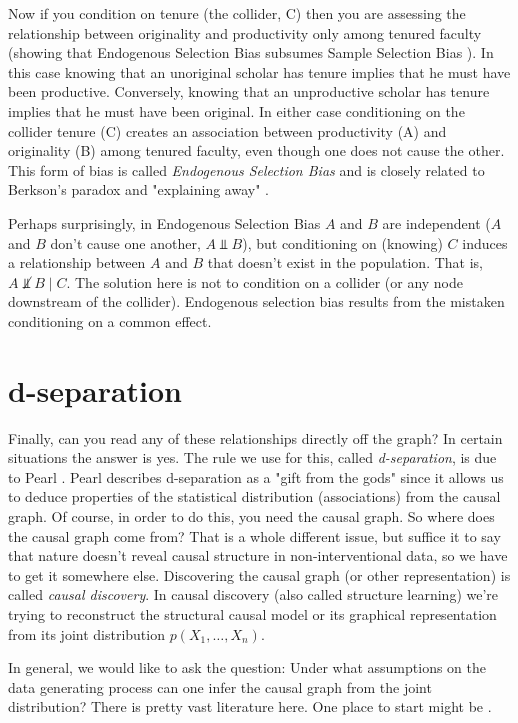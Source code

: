 \documentclass[11pt, oneside]{article}   	%
\begin{document}
\bigskip
\noindent
Now if you condition on tenure (the collider, C) then you are assessing the relationship between originality and productivity only among tenured faculty (showing 
that Endogenous Selection Bias subsumes Sample Selection Bias \cite{2008arXiv0805.2775C}). In this case knowing that an unoriginal scholar has tenure implies 
that he must have been productive. Conversely, knowing that an unproductive scholar has tenure implies that he must have been original. In either case conditioning 
on the collider tenure (C) creates an association between productivity (A) and originality (B) among  tenured faculty, even though one does not cause the other. This form 
of bias is called \emph{Endogenous Selection Bias} and is closely related to Berkson's paradox \cite{Westreich2012} and "explaining away"  \cite{Wellman:1993:EEA:628299.628453}.

\bigskip
\noindent
Perhaps surprisingly, in Endogenous Selection Bias $A$ and $B$ are independent ($A$ and $B$ don't cause one another, $A \Vbar B$), but conditioning on (knowing) $C$ induces a 
relationship between $A$ and $B$ that doesn't exist in the population. That is, $A \not \Vbar B \mid C$. The solution here is not to condition on a 
collider (or any node downstream of the collider). Endogenous selection bias results from the mistaken conditioning on a common effect.

\section{d-separation}
Finally, can you read any of these relationships directly off the graph? In certain situations the answer is yes. The rule we use for this, called \emph{d-separation}, is due
to Pearl \cite{Pearl:1988:PRI:52121}. Pearl describes d-separation as a "gift from the gods" since it allows us to deduce properties of the statistical distribution (associations) 
from the causal  graph. Of course, in order to do this, you need the causal graph. So where does the causal graph come from? That is a whole different issue, but suffice it to 
say that nature doesn't reveal causal structure in non-interventional data, so we have to get it somewhere else. Discovering the causal graph (or other representation) is called 
\emph{causal discovery}.  In causal discovery (also called structure learning) we're trying to reconstruct the structural causal model or its graphical representation from its joint 
distribution $p(X_1, \hdots, X_n)$.

\bigskip
\noindent
In general, we would like to ask the question:  Under what 
assumptions on the data generating process can one infer the causal graph from the joint distribution? There is pretty vast literature here. One place to start might be 
\cite{Peters:2011:ICG:3020548.3020617}. 


\newpage


\end{document}
